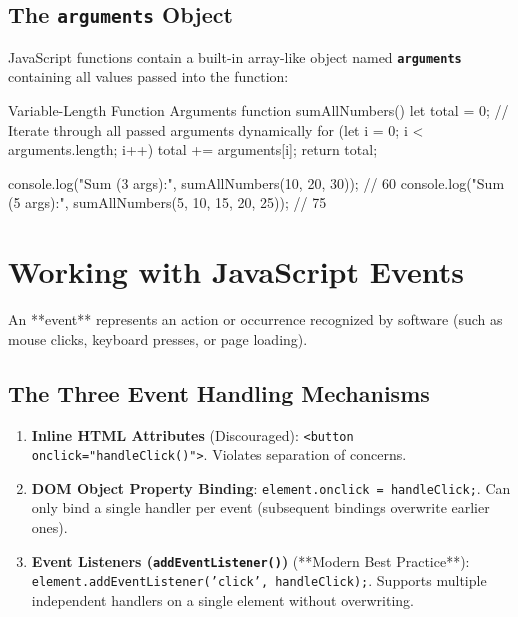 \subsection{The \texttt{arguments} Object}
JavaScript functions contain a built-in array-like object named \textbf{\texttt{arguments}} containing all values passed into the function:

\begin{jscode}{Variable-Length Function Arguments}
function sumAllNumbers() {
    let total = 0;
    // Iterate through all passed arguments dynamically
    for (let i = 0; i < arguments.length; i++) {
        total += arguments[i];
    }
    return total;
}

console.log("Sum (3 args):", sumAllNumbers(10, 20, 30));       // 60
console.log("Sum (5 args):", sumAllNumbers(5, 10, 15, 20, 25)); // 75
\end{jscode}

\section{Working with JavaScript Events}

An **event** represents an action or occurrence recognized by software (such as mouse clicks, keyboard presses, or page loading).

\subsection{The Three Event Handling Mechanisms}
\begin{enumerate}[leftmargin=1.5em]
    \item \textbf{Inline HTML Attributes} (Discouraged): \texttt{<button onclick="handleClick()">}. Violates separation of concerns.
    \item \textbf{DOM Object Property Binding}: \texttt{element.onclick = handleClick;}. Can only bind a single handler per event (subsequent bindings overwrite earlier ones).
    \item \textbf{Event Listeners (\texttt{addEventListener()})} (**Modern Best Practice**): \texttt{element.addEventListener('click', handleClick);}. Supports multiple independent handlers on a single element without overwriting.
\end{enumerate}

